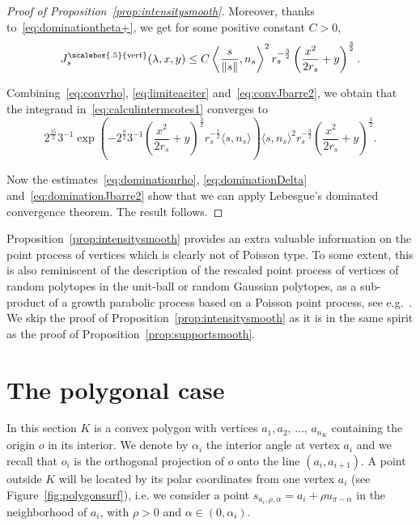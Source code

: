 \documentclass[10pt]{amsart}
\theoremstyle{definition}\newtheorem{defi}[theo]{Definition}\newtheorem{rema}[theo]{Remark}\newtheorem{exam}[theo]{Example}\newtheorem{exem}[theo]{Example}\newtheorem{nota}[theo]{Notation}
\DeclareMathOperator{\Vertt}{\scalebox{.5}{vert}}
\newcommand{\pass}{\vspace{0.3cm}\noindent}
\newcommand{\noi}{\noindent}
\begin{document}
\begin{proof}[{{Proof of Proposition~\ref{prop:intensitysmooth}}}]
Moreover, thanks to~\eqref{eq:dominationtheta+}, we get for some positive constant $C>0$,
\begin{equation}\label{eq:dominationJbarre2}
J^{\Vertt}_{s}(\lambda,x,y)\le C \left\langle \frac{s}{\|s\|},n_s\right\rangle^2r_s^{-\frac{3}{2}}\left(\frac{x^2}{2r_s}+y\right)^{\frac{3}{2}}.
\end{equation}

Combining~\eqref{eq:convrho}, \eqref{eq:limiteaciter} and~\eqref{eq:convJbarre2}, we obtain that the integrand in~\eqref{eq:calculintermcotes1} converges to
\[
2^{\frac{15}{2}}3^{-1}\exp\left(-2^{\frac{9}{2}}3^{-1} \left(\frac{x^2}{2r_s}+y\right)^{\frac{3}{2}} r_{s}^{-\frac1{2}}\langle s,n_s\rangle\right)
\langle s,n_s\rangle^2r_s^{-\frac{3}{2}}\left(\frac{x^2}{2r_s}+y\right)^{\frac{3}{2}}.
\]

Now the estimates~\eqref{eq:dominationrho}, \eqref{eq:dominationDelta} and~\eqref{eq:dominationJbarre2} show that we can apply Lebesgue's dominated convergence theorem. The result follows.
\end{proof}

Proposition~\ref{prop:intensitysmooth} provides an extra valuable information on the point process of vertices which is clearly not of Poisson type. To some extent, this is also reminiscent of the description of the rescaled point process of vertices of random polytopes in the unit-ball or random Gaussian polytopes, as a sub-product of a growth parabolic process based on a Poisson point process, see e.g.~\cite[Theorem~4.1]{CSY}. We skip the proof of Proposition~\ref{prop:intensitysmooth} as it is in the same spirit as the proof of Proposition~\ref{prop:supportsmooth}.



\section{The polygonal case}\label{sec:polygon}

In this section $K$ is a convex polygon with vertices $a_1,a_2,\,\ldots,\,a_{n_K}$ containing the origin $o$ in its interior. We denote by $\alpha_i$ the interior angle at vertex $a_i$ and we recall that $o_i$ is the orthogonal projection of $o$ onto the line $(a_i,a_{i+1})$. A point outside $K$ will be located by its polar coordinates from one vertex $a_i$ (see Figure~\ref{fig:polygonsurf}), i.e. we consider a point $s_{a_i,\rho,\alpha}=a_i+\rho u_{\pi-\alpha}$ in the neighborhood of $a_i$, with $\rho>0$ and $\alpha\in(0,\alpha_i)$.
\end{document}
